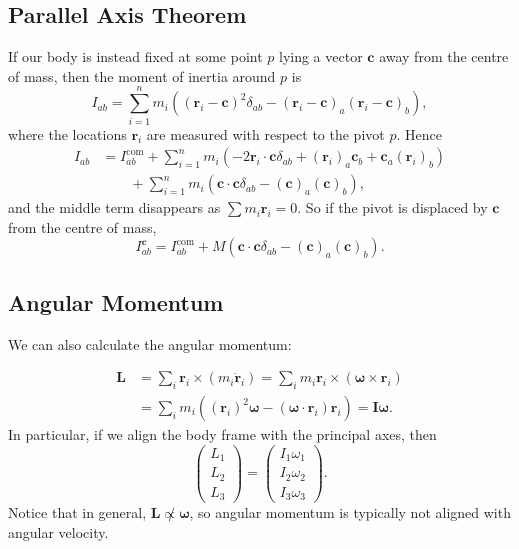 \documentclass[12pt]{article}
\begin{document}
\subsection{Parallel Axis Theorem}
\label{sub:parallel_axis}

If our body is instead fixed at some point $p$ lying a vector $\mathbf{c}$ away from the centre of mass, then the moment of inertia around $p$ is
\[
I_{ab} = \sum_{i=1}^{n} m_i ((\mathbf{r}_i - \mathbf{c})^2 \delta_{ab}  - (\mathbf{r}_i - \mathbf{c})_a (\mathbf{r}_i - \mathbf{c})_b),
\]
where the locations $\mathbf{r}_i$ are measured with respect to the pivot $p$. Hence
\begin{align*}
	I_{ab} &= I_{ab}^{\mathrm{com}} + \sum_{i = 1}^{n} m_i (-2 \mathbf{r}_i \cdot \mathbf{c} \delta_{ab} + (\mathbf{r}_i)_a \mathbf{c}_b + \mathbf{c}_a (\mathbf{r}_i)_b) \\
	       &\qquad + \sum_{i = 1}^{n} m_i(\mathbf{c} \cdot \mathbf{c} \delta_{ab} - (\mathbf{c})_a(\mathbf{c})_b),
\end{align*}
and the middle term disappears as $\sum m_i \mathbf{r}_i = 0$. So if the pivot is displaced by $\mathbf{c}$ from the centre of mass,
\[
I_{ab}^{\mathbf{c}} = I_{ab}^{\mathrm{com}} + M(\mathbf{c} \cdot \mathbf{c} \delta_{ab} - (\mathbf{c})_a(\mathbf{c})_b).
\]


\subsection{Angular Momentum}
\label{sub:ang_mom}

We can also calculate the angular momentum:

\begin{align*}
	\mathbf{L} &= \sum_i \mathbf{r}_i \times (m_i \mathbf{\dot r}_i) = \sum_i m_i \mathbf{r}_i \times (\bm{\omega} \times \mathbf{r}_i) \\
		   &= \sum_{i} m_i((\mathbf{r}_i)^2 \bm{\omega} - (\bm{\omega} \cdot \mathbf{r}_i) \mathbf{r}_i) = \mathbf{I} \bm{\omega}.
\end{align*}
In particular, if we align the body frame with the principal axes, then
\[
\begin{pmatrix}
	L_1\\L_2\\L_3
\end{pmatrix}
=
\begin{pmatrix}
	I_1\omega_1\\I_2\omega_2\\I_3\omega_3
\end{pmatrix}
.
\]
Notice that in general, $\mathbf{L} \not \propto \bm{\omega}$, so angular momentum is typically not aligned with angular velocity.
\end{document}
